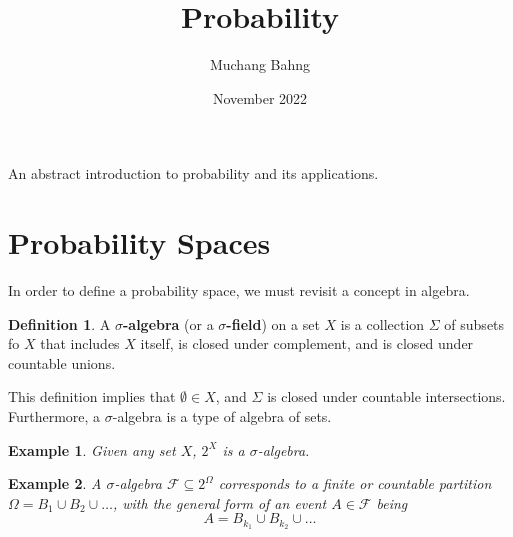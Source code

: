 \documentclass{article}
\newtheorem{example}{Example}[section]
\theoremstyle{remark}
\theoremstyle{definition}
\newtheorem{definition}{Definition}[section]
\begin{document}
\pagestyle{fancy}

\cfoot{\thepage / \pageref{LastPage}}

\title{Probability}
\author{Muchang Bahng}
\date{November 2022}

\maketitle

An abstract introduction to probability and its applications. 

\section{Probability Spaces}
In order to define a probability space, we must revisit a concept in algebra. 

\begin{definition}
A \textbf{$\sigma$-algebra} (or a \textbf{$\sigma$-field}) on a set $X$ is a collection $\Sigma$ of subsets fo $X$ that includes $X$ itself, is closed under complement, and is closed under countable unions. 

This definition implies that $\emptyset \in X$, and $\Sigma$ is closed under countable intersections. Furthermore, a $\sigma$-algebra is a type of algebra of sets. 
\end{definition}

\begin{example}
Given any set $X$, $2^X$ is a $\sigma$-algebra. 
\end{example}

\begin{example}
A $\sigma$-algebra $\mathcal{F} \subseteq 2^{\Omega}$ corresponds to a finite or countable partition $\Omega = B_1 \cup B_2 \cup \ldots$, with the general form of an event $A \in \mathcal{F}$ being 
\[A = B_{k_1} \cup B_{k_2} \cup \ldots \]
\end{example}
\end{document}
